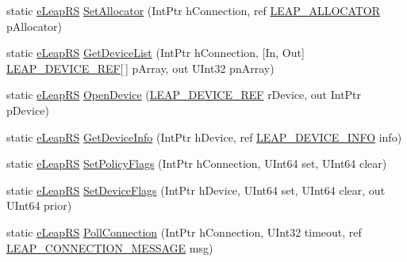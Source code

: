 \begin{DoxyCompactItemize}
\item 
static \mbox{\hyperlink{namespace_leap_internal_ae50b07d24c508b84273392b6dcbea1d9}{e\+Leap\+RS}} \mbox{\hyperlink{class_leap_internal_1_1_leap_c_affea4fe6155597b63cde13664955920d}{Set\+Allocator}} (Int\+Ptr h\+Connection, ref \mbox{\hyperlink{struct_leap_internal_1_1_l_e_a_p___a_l_l_o_c_a_t_o_r}{L\+E\+A\+P\+\_\+\+A\+L\+L\+O\+C\+A\+T\+OR}} p\+Allocator)
\item 
static \mbox{\hyperlink{namespace_leap_internal_ae50b07d24c508b84273392b6dcbea1d9}{e\+Leap\+RS}} \mbox{\hyperlink{class_leap_internal_1_1_leap_c_a4e3fe78202056e73c092818ecce8ee6f}{Get\+Device\+List}} (Int\+Ptr h\+Connection, \mbox{[}In, Out\mbox{]} \mbox{\hyperlink{struct_leap_internal_1_1_l_e_a_p___d_e_v_i_c_e___r_e_f}{L\+E\+A\+P\+\_\+\+D\+E\+V\+I\+C\+E\+\_\+\+R\+EF}}\mbox{[}$\,$\mbox{]} p\+Array, out U\+Int32 pn\+Array)
\item 
static \mbox{\hyperlink{namespace_leap_internal_ae50b07d24c508b84273392b6dcbea1d9}{e\+Leap\+RS}} \mbox{\hyperlink{class_leap_internal_1_1_leap_c_abde768c9d9266c586861d3e123ee2f8f}{Open\+Device}} (\mbox{\hyperlink{struct_leap_internal_1_1_l_e_a_p___d_e_v_i_c_e___r_e_f}{L\+E\+A\+P\+\_\+\+D\+E\+V\+I\+C\+E\+\_\+\+R\+EF}} r\+Device, out Int\+Ptr p\+Device)
\item 
static \mbox{\hyperlink{namespace_leap_internal_ae50b07d24c508b84273392b6dcbea1d9}{e\+Leap\+RS}} \mbox{\hyperlink{class_leap_internal_1_1_leap_c_a2dc6de06ea26d56d00ab08f738eff9ef}{Get\+Device\+Info}} (Int\+Ptr h\+Device, ref \mbox{\hyperlink{struct_leap_internal_1_1_l_e_a_p___d_e_v_i_c_e___i_n_f_o}{L\+E\+A\+P\+\_\+\+D\+E\+V\+I\+C\+E\+\_\+\+I\+N\+FO}} info)
\item 
static \mbox{\hyperlink{namespace_leap_internal_ae50b07d24c508b84273392b6dcbea1d9}{e\+Leap\+RS}} \mbox{\hyperlink{class_leap_internal_1_1_leap_c_aeba99ff7b5740de9709a1535ca6d8ae4}{Set\+Policy\+Flags}} (Int\+Ptr h\+Connection, U\+Int64 set, U\+Int64 clear)
\item 
static \mbox{\hyperlink{namespace_leap_internal_ae50b07d24c508b84273392b6dcbea1d9}{e\+Leap\+RS}} \mbox{\hyperlink{class_leap_internal_1_1_leap_c_a903a82df9979ed709e4d6a05f6a2c1fc}{Set\+Device\+Flags}} (Int\+Ptr h\+Device, U\+Int64 set, U\+Int64 clear, out U\+Int64 prior)
\item 
static \mbox{\hyperlink{namespace_leap_internal_ae50b07d24c508b84273392b6dcbea1d9}{e\+Leap\+RS}} \mbox{\hyperlink{class_leap_internal_1_1_leap_c_a4250f3129c57450a2f2b9e718dd6bb11}{Poll\+Connection}} (Int\+Ptr h\+Connection, U\+Int32 timeout, ref \mbox{\hyperlink{struct_leap_internal_1_1_l_e_a_p___c_o_n_n_e_c_t_i_o_n___m_e_s_s_a_g_e}{L\+E\+A\+P\+\_\+\+C\+O\+N\+N\+E\+C\+T\+I\+O\+N\+\_\+\+M\+E\+S\+S\+A\+GE}} msg)

\end{DoxyCompactItemize}

